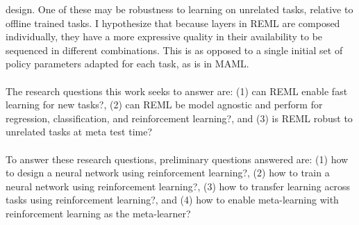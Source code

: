 design. One of these may be robustness to learning on unrelated tasks, relative to 
offline trained tasks. I hypothesize that because layers in REML are composed 
individually, they have a more expressive quality in their availability to be 
sequenced in different combinations. This is as opposed to a single initial set of 
policy parameters adapted for each task, as is in MAML.
\\\\
The research questions this work seeks to answer are: (1) can REML enable fast 
learning for new tasks?, (2) can REML be model agnostic and perform for 
regression, classification, and reinforcement learning?, and (3) is REML robust to 
unrelated tasks at meta test time?
\\\\
To answer these research questions, preliminary questions answered are: (1) how to 
design a neural network using reinforcement learning?, (2) how to train a neural 
network using reinforcement learning?, (3) how to transfer learning across tasks 
using reinforcement learning?, and (4) how to enable meta-learning with 
reinforcement learning as the meta-learner?